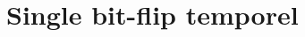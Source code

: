\documentclass{article}
\begin{document}
% 
% 
% 

\section{Single bit-flip temporel}




% 
% 

% 
% 
\end{document}
